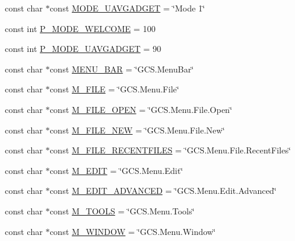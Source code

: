 \begin{DoxyCompactItemize}
\item 
const char $\ast$const \hyperlink{group___core_plugin_ga9eb4e86719a191bbbe45b8b88bd5b952}{\-M\-O\-D\-E\-\_\-\-U\-A\-V\-G\-A\-D\-G\-E\-T} = \char`\"{}\-Mode 1\char`\"{}
\item 
const int \hyperlink{group___core_plugin_ga74beb1e358e2c4aececb356533024014}{\-P\-\_\-\-M\-O\-D\-E\-\_\-\-W\-E\-L\-C\-O\-M\-E} = 100
\item 
const int \hyperlink{group___core_plugin_ga0888b3ef54e714d32bc7be88f5ec9665}{\-P\-\_\-\-M\-O\-D\-E\-\_\-\-U\-A\-V\-G\-A\-D\-G\-E\-T} = 90
\item 
const char $\ast$const \hyperlink{group___core_plugin_ga50fb439908e7b14837faae97dded27a8}{\-M\-E\-N\-U\-\_\-\-B\-A\-R} = \char`\"{}\-G\-C\-S.\-Menu\-Bar\char`\"{}
\item 
const char $\ast$const \hyperlink{group___core_plugin_ga86cd43471b9407a34f91a707e8c37a94}{\-M\-\_\-\-F\-I\-L\-E} = \char`\"{}\-G\-C\-S.\-Menu.\-File\char`\"{}
\item 
const char $\ast$const \hyperlink{group___core_plugin_gad4c9f3e14e10c2a9d9c4211976eb8ce8}{\-M\-\_\-\-F\-I\-L\-E\-\_\-\-O\-P\-E\-N} = \char`\"{}\-G\-C\-S.\-Menu.\-File.\-Open\char`\"{}
\item 
const char $\ast$const \hyperlink{group___core_plugin_ga14c1da71abf115921c56a99fb3198fa2}{\-M\-\_\-\-F\-I\-L\-E\-\_\-\-N\-E\-W} = \char`\"{}\-G\-C\-S.\-Menu.\-File.\-New\char`\"{}
\item 
const char $\ast$const \hyperlink{group___core_plugin_gaa8324f1f075f171b33db9826a3b64b2b}{\-M\-\_\-\-F\-I\-L\-E\-\_\-\-R\-E\-C\-E\-N\-T\-F\-I\-L\-E\-S} = \char`\"{}\-G\-C\-S.\-Menu.\-File.\-Recent\-Files\char`\"{}
\item 
const char $\ast$const \hyperlink{group___core_plugin_ga86eba28e9c200c632b590f5acadbc93a}{\-M\-\_\-\-E\-D\-I\-T} = \char`\"{}\-G\-C\-S.\-Menu.\-Edit\char`\"{}
\item 
const char $\ast$const \hyperlink{group___core_plugin_gaef2e057b6ce5706a053e9e60a64c0199}{\-M\-\_\-\-E\-D\-I\-T\-\_\-\-A\-D\-V\-A\-N\-C\-E\-D} = \char`\"{}\-G\-C\-S.\-Menu.\-Edit.\-Advanced\char`\"{}
\item 
const char $\ast$const \hyperlink{group___core_plugin_ga2991b08955afff85a412c40a92e8d55e}{\-M\-\_\-\-T\-O\-O\-L\-S} = \char`\"{}\-G\-C\-S.\-Menu.\-Tools\char`\"{}
\item 
const char $\ast$const \hyperlink{group___core_plugin_ga665c8a19f32f02590458d538ebf8a197}{\-M\-\_\-\-W\-I\-N\-D\-O\-W} = \char`\"{}\-G\-C\-S.\-Menu.\-Window\char`\"{}
\item 

\end{DoxyCompactItemize}
